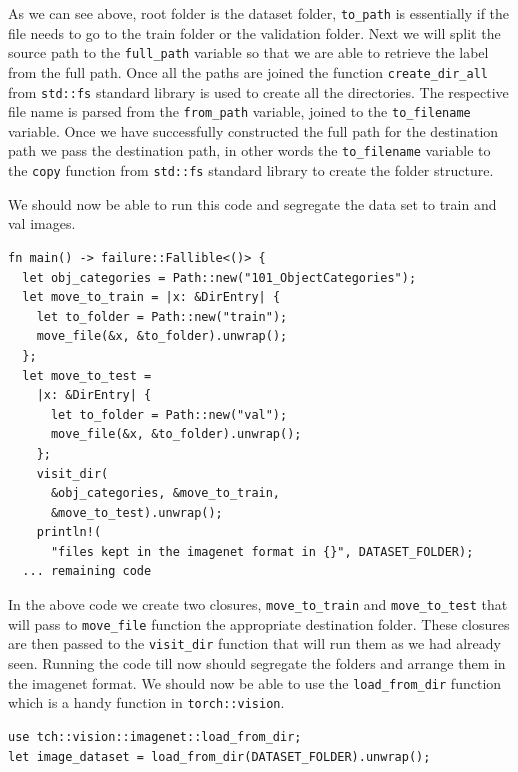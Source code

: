 \documentclass{book}
\begin{document}
As we can see above, root folder is the dataset folder, \lstinline{to_path} is essentially if the file needs to go to the train folder or the validation folder. Next we will split the source path to the \lstinline{full_path} variable so that we are able to retrieve the label from the full path. Once all the paths are joined the function \lstinline{create_dir_all} from \lstinline{std::fs} standard library is used to create all the directories. The respective file name is parsed from the \lstinline{from_path} variable, joined to the \lstinline{to_filename} variable. Once we have successfully constructed the full path for the destination path we pass the destination path, in other words the \lstinline{to_filename} variable to the \lstinline{copy} function from \lstinline{std::fs} standard  library to create the folder structure.

We should now be able to run this code and segregate the data set to train and val images.

\begin{lstlisting}[caption={chapter6/pytorch-image-classification/src/main.rs}, basicstyle=\small]
fn main() -> failure::Fallible<()> {
  let obj_categories = Path::new("101_ObjectCategories");
  let move_to_train = |x: &DirEntry| {
    let to_folder = Path::new("train");
    move_file(&x, &to_folder).unwrap();
  };
  let move_to_test =
    |x: &DirEntry| {
      let to_folder = Path::new("val");
      move_file(&x, &to_folder).unwrap();
    };
    visit_dir(
      &obj_categories, &move_to_train,
      &move_to_test).unwrap();
    println!(
      "files kept in the imagenet format in {}", DATASET_FOLDER);
  ... remaining code
\end{lstlisting}

In the above code we create two closures, \lstinline{move_to_train} and \lstinline{move_to_test} that will pass to \lstinline{move_file} function the appropriate destination folder. These closures are then passed to the \lstinline{visit_dir} function that will run them as we had already seen. Running the code till now should segregate the folders and arrange them in the imagenet format. We should now be able to use the \lstinline{load_from_dir} function which is a handy function in \lstinline{torch::vision}.

\begin{lstlisting}[caption={chapter6/pytorch-image-classification/src/main.rs}, basicstyle=\small]
use tch::vision::imagenet::load_from_dir;
let image_dataset = load_from_dir(DATASET_FOLDER).unwrap();
\end{lstlisting}
\end{document}
